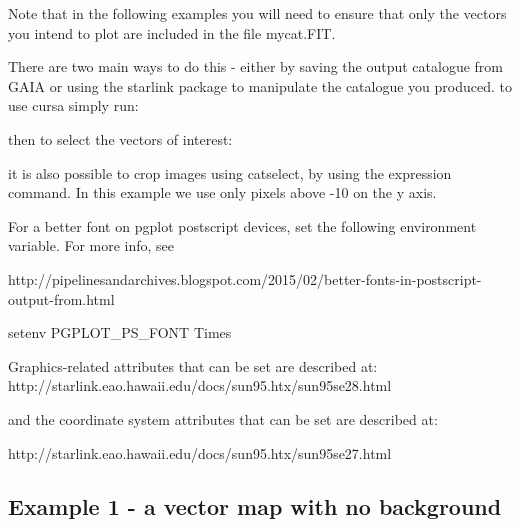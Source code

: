 Note that in the following examples you will need to ensure that only the
vectors you intend to plot are included in the file mycat.FIT.

There are two main ways to do this - either by saving the output catalogue
from GAIA or using the starlink package \cursa to manipulate the catalogue you produced.
to use cursa simply run:

\begin{terminalv}
\end{terminalv}

then to select the vectors of interest:

\begin{terminalv}
\end{terminalv}

it is also possible to crop images using catselect, by using the expression command. 
In this example we use only pixels above -10 on the y axis.

\begin{terminalv}
\end{terminalv}




\begin{tip}
For a better font on pgplot postscript devices, set the
following environment variable. For more info, see

http://pipelinesandarchives.blogspot.com/2015/02/better-fonts-in-postscript-output-from.html

\begin{terminalv}
setenv PGPLOT_PS_FONT Times
\end{terminalv}

Graphics-related attributes that can be set are described at:
http://starlink.eao.hawaii.edu/docs/sun95.htx/sun95se28.html

and the coordinate system attributes that can be set are
described at:

http://starlink.eao.hawaii.edu/docs/sun95.htx/sun95se27.html
\end{tip}



\subsection{ Example 1 - a vector map with no background}
\label{section:kappa-example1}

